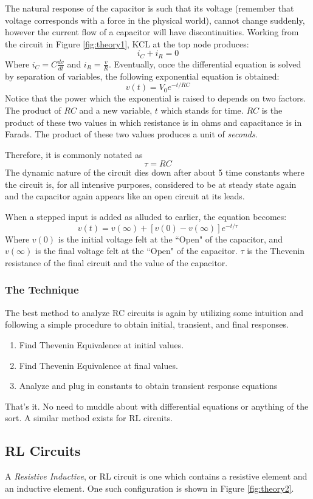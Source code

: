 \documentclass[12pt]{article}
\begin{document}
The natural response of the capacitor is such that its voltage (remember that
voltage corresponds with a force in the physical world), cannot change suddenly,
however the current flow of a capacitor will have discontinuities. Working from
the circuit in Figure \ref{fig:theory1}, KCL at the top node produces:
\[
	i_C + i_R = 0
\]
Where $i_C = C \frac{dv}{dt}$ and $i_R = \frac{v}{R}$.
Eventually, once the differential equation is solved by separation of variables,
the following exponential equation is obtained:
\[
	v(t) = V_0e^{-t/RC}
\]
Notice that the power which the exponential is raised to depends on two factors.
The product of $RC$ and a new variable, $t$ which stands for time. $RC$ is the
product of these two values in which resistance is in ohms and capacitance is in
Farads. The product of these two values produces a unit of \textit{seconds}.

Therefore, it is commonly notated as
\[
	\tau = RC
\]
The dynamic nature of the circuit dies down after about 5 time constants where
the circuit is, for all intensive purposes, considered to be at steady state
again and the capacitor again appears like an open circuit at its leads.

When a stepped input is added as alluded to earlier, the equation becomes:
\[
	v(t) = v(\infty) + [v(0) - v(\infty)]e^{-t/\tau}
\]
Where $v(0)$ is the initial voltage felt at the ``Open" of the capacitor, and
$v(\infty)$ is the final voltage felt at the ``Open" of the capacitor. $\tau$ is
the Thevenin resistance of the final circuit and the value of the capacitor. 

\subsubsection{The Technique}
The best method to analyze RC circuits is again by utilizing some intuition
and following a simple procedure to obtain initial, transient, and final
responses.
\begin{enumerate}
	\item Find Thevenin Equivalence at initial values.
	\item Find Thevenin Equivalence at final values.
	\item Analyze and plug in constants to obtain transient response equations
\end{enumerate}
That's it. No need to muddle about with differential equations or anything of
the sort. A similar method exists for RL circuits.

\subsection{RL Circuits}
A \textit{Resistive Inductive}, or RL circuit is one which contains a resistive
element and an inductive element. One such configuration is shown in Figure
\ref{fig:theory2}.
\end{document}
